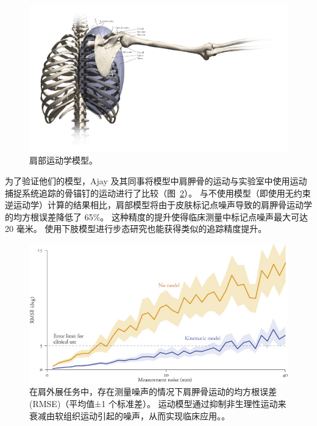 \begin{figure}[!htb]
	\centering
	\includegraphics[width=1.0\linewidth]{chap7/7_15}
	\caption{肩部运动学模型\cite{seth2016biomechanical}。 \label{fig:7_15}}
\end{figure}

为了验证他们的模型，Ajay 及其同事将模型中肩胛骨的运动与实验室中使用运动捕捉系统追踪的骨锚钉的运动进行了比较（图~\ref{fig:7_16}）。
与不使用模型（即使用无约束逆运动学）计算的结果相比，肩部模型将由于皮肤标记点噪声导致的肩胛骨运动学的均方根误差降低了 65\%。
这种精度的提升使得临床测量中标记点噪声最大可达 20 毫米。
使用下肢模型进行步态研究也能获得类似的追踪精度提升。

\begin{figure}[!htb]
	\centering
	\includegraphics[width=1.0\linewidth]{chap7/7_16}
	\caption{在肩外展任务中，存在测量噪声的情况下肩胛骨运动的均方根误差 (RMSE)（平均值±1 个标准差）。
		运动模型通过抑制非生理性运动来衰减由软组织运动引起的噪声，从而实现临床应用。\cite{seth2016biomechanical}。 \label{fig:7_16}}
\end{figure}



